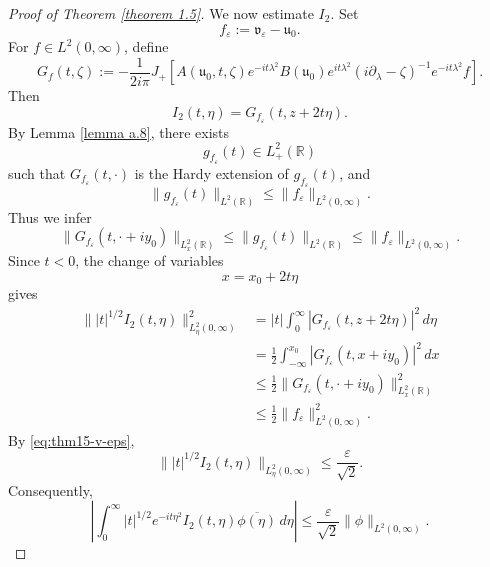 \documentclass[10pt]{article}
\numberwithin{equation}{section}
\numberwithin{theorem}{section}
\begin{document}
\begin{proof}[Proof of Theorem \ref{theorem 1.5}]
We now estimate \(I_2\). Set
\[
f_\varepsilon:=\mathfrak v_\varepsilon-\mathfrak u_0.
\]
For \(f\in L^2(0,\infty)\), define
\begin{equation}
\label{eq:thm15-Gf-def}
G_f(t,\zeta)
:=
-\frac1{2i\pi}
J_+\left[
A(\mathfrak u_0,t,\zeta)e^{-it\lambda^2}
B(\mathfrak u_0)e^{it\lambda^2}
(i\partial_\lambda-\zeta)^{-1}
e^{-it\lambda^2}f
\right].
\end{equation}
Then
\[
I_2(t,\eta)=G_{f_\varepsilon}(t,z+2t\eta).
\]
By Lemma \ref{lemma a.8}, there exists
\[
g_{f_\varepsilon}(t)\in L^2_+(\mathbb R)
\]
such that \(G_{f_\varepsilon}(t,\cdot)\) is the Hardy extension of
\(g_{f_\varepsilon}(t)\), and
\begin{equation}
\label{eq:thm15-G-boundary-L2-bound}
\|g_{f_\varepsilon}(t)\|_{L^2(\mathbb R)}
\le
\|f_\varepsilon\|_{L^2(0,\infty)}.
\end{equation}
Thus we infer
\begin{equation}
\label{eq:thm15-G-horizontal-bound}
\|G_{f_\varepsilon}(t,\cdot+iy_0)\|_{L^2_x(\mathbb R)}
\le
\|g_{f_\varepsilon}(t)\|_{L^2(\mathbb R)}
\le
\|f_\varepsilon\|_{L^2(0,\infty)}.
\end{equation}
Since \(t<0\), the change of variables
\[
x=x_0+2t\eta
\]
gives
\begin{equation}
\label{eq:thm15-I2-L2-bound}
\begin{aligned}
\bigl\||t|^{1/2}I_2(t,\eta)\bigr\|_{L^2_\eta(0,\infty)}^2
&=
|t|\int_0^\infty
|G_{f_\varepsilon}(t,z+2t\eta)|^2\,d\eta \\
&=
\frac12
\int_{-\infty}^{x_0}
|G_{f_\varepsilon}(t,x+iy_0)|^2\,dx \\
&\le
\frac12
\|G_{f_\varepsilon}(t,\cdot+iy_0)\|_{L^2_x(\mathbb R)}^2 \\
&\le
\frac12
\|f_\varepsilon\|_{L^2(0,\infty)}^2.
\end{aligned}
\end{equation}
By \eqref{eq:thm15-v-eps},
\begin{equation}
\label{eq:thm15-I2-eps-bound}
\bigl\||t|^{1/2}I_2(t,\eta)\bigr\|_{L^2_\eta(0,\infty)}
\le
\frac{\varepsilon}{\sqrt2}.
\end{equation}
Consequently,
\begin{equation}
\label{eq:thm15-I2-test-bound}
\left|
\int_0^\infty
|t|^{1/2}e^{-it\eta^2}
I_2(t,\eta)\overline{\phi(\eta)}\,d\eta
\right|
\le
\frac{\varepsilon}{\sqrt2}\|\phi\|_{L^2(0,\infty)}.
\end{equation}


\end{proof}
\end{document}
